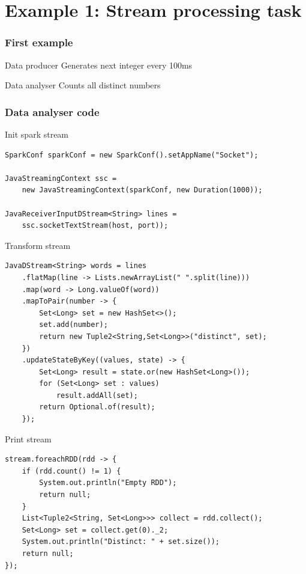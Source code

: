 \documentclass{beamer}
\begin{document}
\section{Example 1: Stream processing task}

\begin{frame}[allowframebreaks]
\frametitle{First example}
\begin{block}{Data producer}
	Generates next integer every 100ms
\end{block}
\begin{block}{Data analyser}
	Counts all distinct numbers
\end{block}
\end{frame}

\begin{frame}
\frametitle{Data analyser code}
\begin{block}{Init spark stream}
\begin{lstlisting}
SparkConf sparkConf = new SparkConf().setAppName("Socket");

JavaStreamingContext ssc = 
    new JavaStreamingContext(sparkConf, new Duration(1000));
    
JavaReceiverInputDStream<String> lines = 
    ssc.socketTextStream(host, port));
\end{lstlisting}
\end{block}

\begin{block}{Transform stream}
\begin{lstlisting}
JavaDStream<String> words = lines
    .flatMap(line -> Lists.newArrayList(" ".split(line)))
    .map(word -> Long.valueOf(word))
    .mapToPair(number -> {
        Set<Long> set = new HashSet<>();
        set.add(number);
        return new Tuple2<String,Set<Long>>("distinct", set);
    })
    .updateStateByKey((values, state) -> {
        Set<Long> result = state.or(new HashSet<Long>());
        for (Set<Long> set : values)
            result.addAll(set);
        return Optional.of(result);
    });
\end{lstlisting}
\end{block}

\begin{block}{Print stream}
\begin{lstlisting}
stream.foreachRDD(rdd -> {
    if (rdd.count() != 1) {
        System.out.println("Empty RDD");
        return null;
    }
    List<Tuple2<String, Set<Long>>> collect = rdd.collect();
    Set<Long> set = collect.get(0)._2;
    System.out.println("Distinct: " + set.size());
    return null;
});
\end{lstlisting}
\end{block}

\end{frame}
\end{document}
